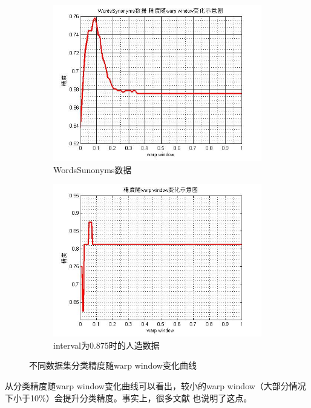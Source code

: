 \begin{figure}[h]
    \begin{subfigure}[h]{0.4\linewidth}
        \includegraphics[width=\linewidth]{./figure/WordsSunonyms.jpg}
        \caption{WordsSunonyms数据} \label{fig:subfigure:3}
    \end{subfigure}
    \quad
    \begin{subfigure}[h]{0.4\linewidth}
        \includegraphics[width=\linewidth]{./figure/accuracy_warp_window.jpg}
        \caption{interval为0.875时的人造数据} \label{fig:subfigure:4}
    \end{subfigure}
    \caption{不同数据集分类精度随warp window变化曲线}
    \label{fig:13}
\end{figure}
从分类精度随warp window变化曲线可以看出，较小的warp window（大部分情况下小于10\%）会提升分类精度。事实上，很多文献\cite{UCR_data} \cite{Ratanamahatana2005} 也说明了这点。


